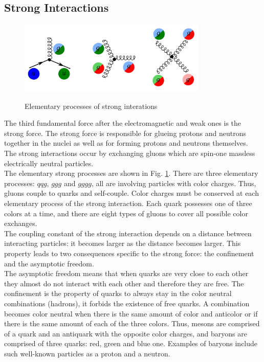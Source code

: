 \subsection{Strong Interactions}
\label{sec:Intro_QCD}

\begin{figure}[htb]
  \begin{center}
    {\includegraphics[width=0.80\textwidth]{../figs/Intro/feynmStrong.png}}
    \caption{Elementary processes of strong interations}
    \label{fig:feynmStrong}
  \end{center}
\end{figure}


The third fundamental force after the electromagnetic and weak ones is the strong force. The strong force is responsible for glueing protons and neutrons together in the nuclei as well as for forming protons and neutrons themselves. The strong interactions occur by exchanging gluons which are spin-one massless electrically neutral particles.  \\

The elementary strong processes are shown in Fig. \ref{fig:feynmStrong}. There are three elementary processes: $qqg$, $ggg$ and $gggg$, all are involving particles with color charges. Thus, gluons couple to quarks and self-couple. Color charges must be conserved at each elementary process of the strong interaction. Each quark possesses one of three colors at a time, and there are eight types of gluons to cover all possible color exchanges. \\

The coupling constant of the strong interaction depends on a distance between interacting particles: it becomes larger as the distance becomes larger. This property leads to two consequences specific to the strong force: the confinement and the asymptotic freedom.\\

The asymptotic freedom means that when quarks are very close to each other they almost do not interact with each other and therefore they are free. The confinement is the property of quarks to always stay in the color neutral combinations (hadrons), it forbids the existence of free quarks. A combination becomes color neutral when there is the same amount of color and anticolor or if there is the same amount of each of the three colors.  Thus, mesons are comprised of a quark and an antiquark with the opposite color charges, and baryons are comprised of three quarks: red, green and blue one. Examples of baryons include such well-known particles as a proton and a neutron.\\

